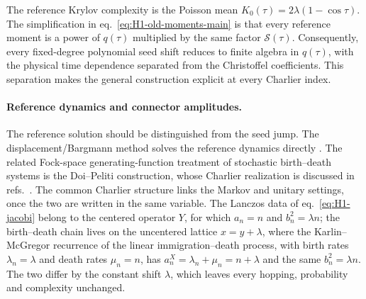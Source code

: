 \documentclass[a4paper,11pt]{article}
\theoremstyle{definition}
\theoremstyle{remark}
\newcommand{\cS}{\mathcal S}
\begin{document}
The reference Krylov complexity is the Poisson mean $K_0(\tau)=2\lambda(1-\cos\tau)$. The simplification in eq.~\eqref{eq:H1-old-moments-main} is that every reference moment is a power of $q(\tau)$ multiplied by the same factor $\cS(\tau)$. Consequently, every fixed-degree polynomial seed shift reduces to finite algebra in $q(\tau)$, with the physical time dependence separated from the Christoffel coefficients. This separation makes the general construction explicit at every Charlier index.

\paragraph{Reference dynamics and connector amplitudes.}
The reference solution should be distinguished from the seed jump. The displacement/Bargmann method solves the reference dynamics directly \cite{Perelomov1986}. The related Fock-space generating-function treatment of stochastic birth--death systems is the Doi--Peliti construction, whose Charlier realization is discussed in refs.~\cite{Doi1976,Peliti1985,Ohkubo2012}. The common Charlier structure links the Markov and unitary settings, once the two are written in the same variable. The Lanczos data of eq.~\eqref{eq:H1-jacobi} belong to the centered operator $Y$, for which $a_n=n$ and $b_n^2=\lambda n$; the birth--death chain lives on the uncentered lattice $x=y+\lambda$, where the Karlin--McGregor recurrence of the linear immigration--death process, with birth rates $\lambda_n=\lambda$ and death rates $\mu_n=n$, has $a_n^{X}=\lambda_n+\mu_n=n+\lambda$ and the same $b_n^2=\lambda n$. The two differ by the constant shift $\lambda$, which leaves every hopping, probability and complexity unchanged.
\end{document}
